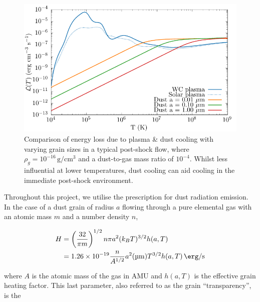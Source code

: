 \begin{figure}[h]
  \centering
  \includegraphics{assets/dust-plasma-cooling-comparison/cooling-comparison-forpaper2.pdf}
  \caption[Comparison of dust and plasma cooling rates in post-shock environment]{Comparison of energy loss due to plasma \& dust cooling with varying grain sizes in a typical post-shock flow, where $\rho_g = 10^{-16} \, \si{\gram\per\centi\metre\cubed}$ and a dust-to-gas mass ratio of $10^{-4}$. Whilst less influential at lower temperatures, dust cooling can aid cooling in the immediate post-shock environment.}
  \label{fig:postshockcoolcomparison-chapter3}
\end{figure}


Throughout this project, we utilise the \textcite{dwek_infrared_1981} prescription for dust radiation emission.
In the case of a dust grain of radius $a$ flowing through a pure elemental gas with an atomic mass $m$ and a number density $n$, 

\begin{equation}
  \begin{split}
    H & = \left(\frac{32}{\pi m}\right)^{1/2} n\pi a^2 (k_B T)^{3/2} h(a,T) \\
    & = \num{1.26e-19} \frac{n}{A^{1/2}} a^2 (\si{\micro\metre}) T^{3/2} h(a,T) \, \si{\erg\per\second}
  \end{split}
\end{equation}

\noindent
where $A$ is the atomic mass of the gas in AMU and $h(a,T)$ is the effective grain heating factor.
This last parameter, also referred to as the grain ``transparency'', is the 


